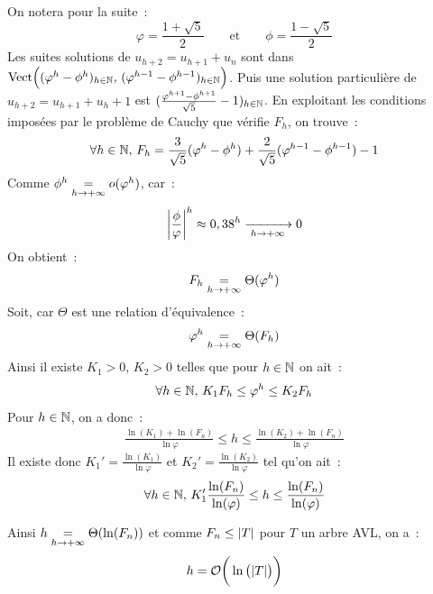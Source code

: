 On notera pour la suite~: 
$$\varphi = \frac{1 + \sqrt{5}}{2}\qquad \text{et} \qquad \phi = \frac{1 - \sqrt{5}}{2}$$
Les suites solutions de $u_{h+2} = u_{h+1} + u_n$ sont dans $\text{Vect}\Big((\varphi^h - \phi^h)_{h \in \mathbb{N}},\, (\varphi^{h-1} - \phi^{h-1})_{h \in \mathbb{N}}\Big)$. Puis une solution particulière de $u_{h+2} = u_{h+1} + u_{h} + 1$ est $(\frac{\varphi^{h+1} - \phi^{h+1}}{\sqrt{5}} - 1)_{h \in \mathbb{N}}$.
En exploitant les conditions imposées par le problème de Cauchy que vérifie $F_h$, on trouve~:
$$\forall h \in \mathbb{N},\, F_h = \frac{3}{\sqrt{5}}(\varphi^h - \phi^h) + \frac{2}{\sqrt{5}}(\varphi^{h-1} - \phi^{h-1}) - 1$$
Comme $\phi^h \underset{h \to + \infty}{\overset{{}}{=}} o(\varphi^h)$, car~:
$$\bigg\vert\frac{\phi}{\varphi}\bigg\vert^h \approx 0,38^h \xrightarrow[\;h \to + \infty\;]{} 0$$
On obtient~:
$$F_h \underset{h \to + \infty}{\overset{{}}{=}} \Theta(\varphi^h)$$
Soit, car $\Theta$ est une relation d'équivalence~:
$$\varphi^h \underset{h \to + \infty}{\overset{{}}{=}} \Theta(F_h)$$
Ainsi il existe $K_1 >0$, $K_2 > 0$ telles que pour $h \in \mathbb{N}$ on ait~:
$$\forall h \in \mathbb{N},\, K_1 F_h \leq \varphi^h \leq K_2 F_h $$
Pour $h \in \mathbb{N}$, on a donc~:
\begin{align*}
    \frac{\ln(K_1) + \ln(F_n)}{\ln{\varphi}} \leq h \leq \frac{\ln(K_2) + \ln(F_n)}{\ln{\varphi}}
\end{align*}
Il existe donc $K_1' = \frac{\ln(K_1)}{\ln{\varphi}}$ et $K_2' = \frac{\ln(K_2)}{\ln{\varphi}}$ tel qu'on ait~:
$$\forall h \in \mathbb{N},\, K_1' \frac{\ln(F_n)}{\ln(\varphi)} \leq h \leq \frac{\ln(F_n)}{\ln(\varphi)}$$

Ainsi $h \underset{h \to + \infty}{\overset{{}}{=}} \Theta(\ln(F_n))$
et comme $F_n \leq |T|$ pour $T$ un arbre AVL, on a~:
$$h = \mathcal{O}\bigg(\ln\big(|T|\big)\bigg)$$
